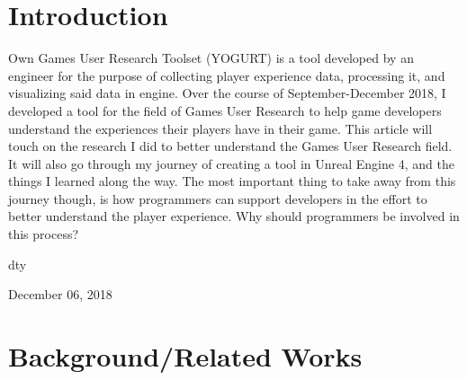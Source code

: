\documentclass[journal]{IEEEtran}
\begin{document}
\section{Introduction}
% 
% 
% 
% 
 Own Games User Research Toolset (YOGURT) is a tool developed by an engineer for the purpose of collecting player experience data, processing it, and visualizing said data in engine. Over the course of September-December 2018, I developed a tool for the field of Games User Research to help game developers understand the experiences their players have in their game. This article will touch on the research I did to better understand the Games User Research field. It will also go through my journey of creating a tool in Unreal Engine 4, and the things I learned along the way. The most important thing to take away from this journey though, is how programmers can support developers in the effort to better understand the player experience. Why should programmers be involved in this process?

\hfill dty
 
\hfill December 06, 2018

\section{Background/Related Works}
\end{document}
